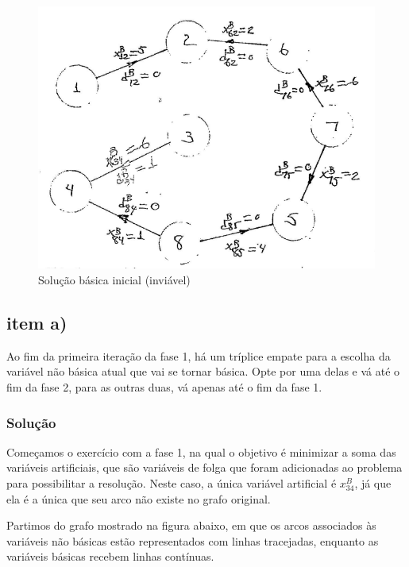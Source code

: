 \documentclass{article}
\begin{document}
\begin{figure}[H]
    \centering
    \includegraphics[scale=0.6]{images/q1-enunciado2.png}
    \caption{Solução básica inicial (inviável)}
\end{figure}


\subsection{item a)}

Ao fim da primeira iteração da fase 1, há um tríplice empate para a escolha da variável não básica atual que vai se tornar básica.
Opte por uma delas e vá até o fim da fase 2, para as outras duas, vá apenas até o fim da fase 1.


\subsubsection{Solução}

Começamos o exercício com a fase 1, na qual o objetivo é minimizar a soma das variáveis artificiais, que são variáveis de folga que foram adicionadas ao problema para possibilitar a resolução.
Neste caso, a única variável artificial é $x^{B}_{34}$, já que ela é a única que seu arco não existe no grafo original.

Partimos do grafo mostrado na figura abaixo, em que os arcos associados às variáveis não básicas estão representados com linhas tracejadas, enquanto as variáveis básicas recebem linhas contínuas.
\end{document}
